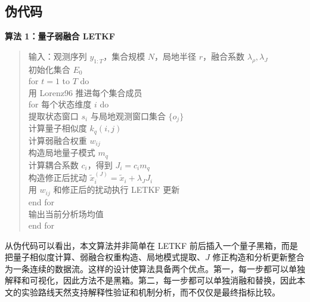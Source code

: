 \subsection{伪代码}
\noindent\textbf{算法 1：量子弱融合 LETKF}
\begin{quote}
\small\ttfamily
输入：观测序列 $y_{1:T}$，集合规模 $N$，局地半径 $r$，融合系数 $\lambda_\rho,\lambda_J$\\
初始化集合 $E_0$\\
for $t=1$ to $T$ do\\
\quad 用 Lorenz96 推进每个集合成员\\
\quad for 每个状态维度 $i$ do\\
\qquad 提取状态窗口 $s_i$ 与局地观测窗口集合 $\{o_j\}$\\
\qquad 计算量子相似度 $k_q(i,j)$\\
\qquad 计算弱融合权重 $w_{ij}$\\
\qquad 构造局地量子模式 $m_q$\\
\qquad 计算耦合系数 $c_i$，得到 $J_i=c_i m_q$\\
\qquad 构造修正后扰动 $\tilde{x}_i^{(J)}=\tilde{x}_i+\lambda_J J_i$\\
\qquad 用 $w_{ij}$ 和修正后的扰动执行 LETKF 更新\\
\quad end for\\
\quad 输出当前分析场均值\\
end for
\end{quote}

从伪代码可以看出，本文算法并非简单在 LETKF 前后插入一个量子黑箱，而是把量子相似度计算、弱融合权重构造、局地模式提取、$J$ 修正构造和分析更新整合为一条连续的数据流。这样的设计使算法具备两个优点。第一，每一步都可以单独解释和可视化，因此方法不是黑箱。第二，每一步都可以单独消融和替换，因此本文的实验路线天然支持解释性验证和机制分析，而不仅仅是最终指标比较。
